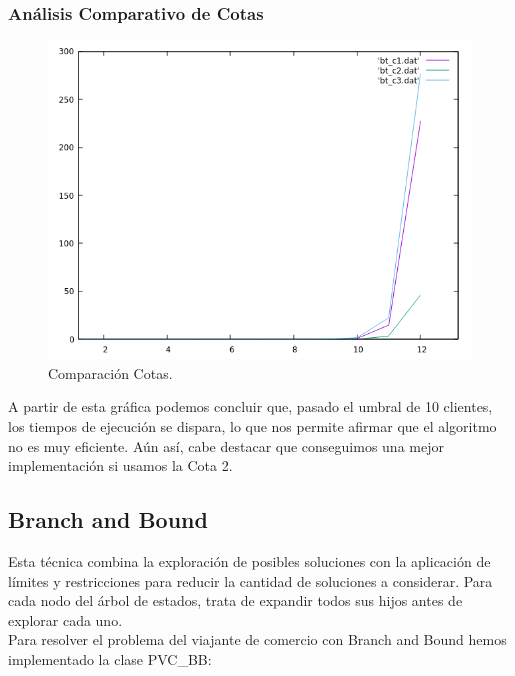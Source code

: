 \documentclass[a4paper,12pt,twoside]{article} %
\begin{document}
\subsubsection{Análisis Comparativo de Cotas}
\begin{figure}[h]
  \begin{center}
  
  	\includegraphics[scale=0.7]{IMAGENES/comparativa_bt.png}
  	\caption{Comparación Cotas.}
  	
  \end{center}
\end{figure}

A partir de esta gráfica podemos concluir que, pasado el umbral de 10 clientes, los tiempos de ejecución se dispara, lo que nos permite afirmar que el algoritmo no es muy eficiente. Aún así, cabe destacar que conseguimos una mejor implementación si usamos la Cota 2.
\newpage


\subsection{Branch and Bound}
Esta técnica combina la exploración de posibles soluciones con la aplicación de límites y restricciones para reducir la cantidad de soluciones a considerar. Para cada nodo del árbol de estados, trata de expandir todos sus hijos antes de explorar cada uno.\\

Para resolver el problema del viajante de comercio con Branch and Bound hemos implementado la clase PVC\_BB:\\
\end{document}
